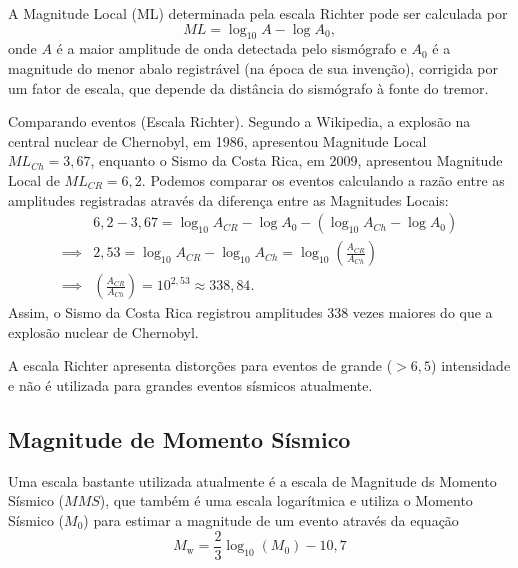A Magnitude Local (ML) determinada pela escala Richter pode ser calculada por
$$
ML = \log_{10} A - \log A_0,
$$
onde $A$ é a maior amplitude de onda detectada pelo sismógrafo e $A_0$ é a magnitude do menor abalo registrável (na época de sua invenção), corrigida por um fator de escala, que depende da distância do sismógrafo à fonte do tremor.


\begin{example}{Comparando eventos (Escala Richter).}
Segundo a Wikipedia, a explosão na central nuclear de Chernobyl, em 1986, apresentou Magnitude Local $ML_{Ch} = 3{,}67$, enquanto o Sismo da Costa Rica, em 2009, apresentou Magnitude Local de $ML_{CR}=6{,}2$. Podemos comparar os eventos calculando a razão entre as amplitudes registradas através da diferença entre as Magnitudes Locais:
\begin{align*}
&6{,}2-3{,}67 = \log_{10} A_{CR} - \log A_0 - (\log_{10} A_{Ch} - \log A_0)\\
\implies & 2{,}53 = \log_{10} A_{CR} - \log_{10} A_{Ch} = \log_{10} \left(\frac{A_{CR}}{A_{Ch}}\right)\\
\implies & \left(\frac{A_{CR}}{A_{Ch}}\right) = 10^{2{,}53} \approx 338{,}84.
\end{align*} 
Assim, o Sismo da Costa Rica registrou amplitudes 338 vezes maiores do que a explosão nuclear de Chernobyl.
\end{example}

A escala Richter apresenta distorções para eventos de grande ($>6{,}5$) intensidade e não é utilizada para grandes eventos sísmicos atualmente.

\subsection{Magnitude de Momento Sísmico}

Uma escala bastante utilizada atualmente é a escala de Magnitude ds Momento Sísmico ($MMS$), que também é uma escala logarítmica e utiliza o Momento Sísmico ($M_0$) para estimar a magnitude de um evento através da equação
$$
M_{\mathrm {w} }={\frac{2}{3}}\log_{10}\left(M_{0}\right)-10,7
$$

